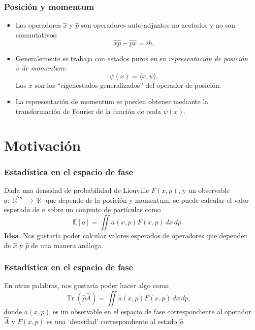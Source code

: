 \documentclass{beamer}
\DeclareMathOperator{\R}{\mathbb{R}}
\DeclareMathOperator{\Tr}{Tr}
\begin{document}
\begin{frame}
  \frametitle{Posición y momentum}

  \begin{itemize}
    \item Los operadores $\hat{x}$ y $\hat{p}$ son
      operadores auto-adjuntos no acotados y no son
      conmutativos:
      \[
        \hat{x}\hat{p} - \hat{p}\hat{x} = i\hbar.
      \] 
    \item Generalemente se trabaja con estados puros en su
      \textit{representación de posición o de momentum}:
      \[
        \psi(x) = \langle x, \psi \rangle.
      \] 
      Los $x$ son los ``eigenestados generalizados'' del
      operador de posición.
    \item La representación de momentum se pueden obtener
      mediante la transformación de Fourier de la función de
      onda $\psi(x)$.
  \end{itemize}
\end{frame}

\section{Motivación}

\begin{frame}
  \frametitle{Estadística en el espacio de fase} Dada una
  densidad de probabilidad de Liouville $F(x,p)$, y un
  observable $a : \R^{2n} \to \R$ que depende de la posición
  y momentum, se puede calcular el valor esperado de $a$
  sobre un conjunto de partículas como
  \begin{equation}
    \mathbb E[a] = \iint a(x,p) F(x,p) \, dx \, dp.
  \end{equation}
  \textbf{Idea}. Nos gustaría poder
    calcular valores esperados de operadores que dependen de
    $\hat{x}$ y $\hat{p}$ de una manera análoga.
\end{frame}

\begin{frame}
  \frametitle{Estadística en el
    espacio de fase} En otras palabras, nos gustaría poder
    hacer algo como
  \begin{equation}
    \Tr\left( \hat{\rho}\hat{A} \right) 
    = \iint a(x,p) F(x,p) \, dx \, dp,
  \end{equation}
  donde $a(x,p)$ es un observable en el espacio de fase
  correspondiente al operador $\hat{A}$ y $F(x,p)$ es una
  `densidad' correspondiente al estado $\hat{\rho}$.
\end{frame}
\end{document}

